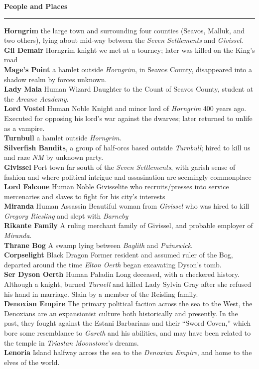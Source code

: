 \documentclass[letterpaper]{article}
\newcommand{\e}[1]{\emph{#1}}
\newcommand{\B}[1]{\textbf{#1}}
\newenvironment{notesection}[1]
{ {\huge \B{#1}}\hrule\vspace{0.5em}\begingroup\fontsize{9pt}{12pt}\selectfont}
{\endgroup}
\newcommand{\person}[3]{\B{#1
    \ifstrequal{#2}{M}{{\color{ProcessBlue}\male}}{%
    \ifstrequal{#2}{F}{\color{VioletRed}\female}{}}}{\scriptsize #3}}
\begin{document}
\begin{notesection}{People and Places}
\B{Horngrim} the large town and surrounding four counties (Seavos, Malluk, and two others), lying about mid-way between the \e{Seven Settlements} and \e{Givissel}.\\
\person{Gil Demair} \e{Horngrim} knight we met at a tourney; later was killed on the King's road\\
\B{Mage's Point} a hamlet outside \e{Horngrim}, in Seavos County, disappeared into a shadow realm by forces unknown.\\
\person{Lady Mala}{F}{Human Wizard} Daughter to the Count of Seavos County, student at the \e{Arcane Academy}.\\
\person{Lord Vostel}{M}{Human Noble} Knight and minor lord of \e{Horngrim} 400 years ago. Executed for opposing his lord's war against the dwarves; later returned to unlife as a vampire.\\
\B{Turnbull} a hamlet outside \e{Horngrim}.\\
\B{Silverfish Bandits}, a group of half-orcs based outside \e{Turnbull}; hired to kill us and raze \e{NM} by unknown party.\\

\B{Givissel} Port town far south of the \e{Seven Settlements}, with garish sense of fashion and where political intrigue and assasination are seemingly commonplace \\
\person{Lord Falcone}{M}{Human Noble} Givisselite who recruits/presses into service mercenaries and slaves to fight for his city's interests\\
\person{Miranda}{F}{Human Assassin} Beautiful woman from \e{Givissel} who was hired to kill \e{Gregory Riesling} and slept with \e{Barneby} \\
\B{Rikante Family} A ruling merchant family of Givissel, and probable employer of \e{Miranda}.\\

\B{Thrane Bog} A swamp lying between \e{Baylith} and \e{Painswick}.\\
\person{Corpselight}{F}{Black Dragon} Former resident and assumed ruler of the Bog, departed around the time \e{Elton Oerth} began excavating Dyson's tomb.\\
\person{Ser Dyson Oerth}{M}{Human Paladin} Long deceased, with a checkered history. Although a knight, burned \e{Turnell} and killed Lady Sylvia Gray after she refused his hand in marriage. Slain by a member of the Reisling family.\\

\B{Denoxian Empire} The primary political faction across the sea to the West, the Denoxians are an expansionist culture both historically and presently. In the past, they fought against the Estani Barbarians and their ``Sword Coven,'' which bore some resemblance to \e{Gareth} and his abilities, and may have been related to the temple in \e{Triastan Moonstone}'s dreams.\\
\B{Lenoria} Island halfway across the sea to the \e{Denoxian Empire}, and home to the elves of the world.\\
\end{notesection}
\end{document}
